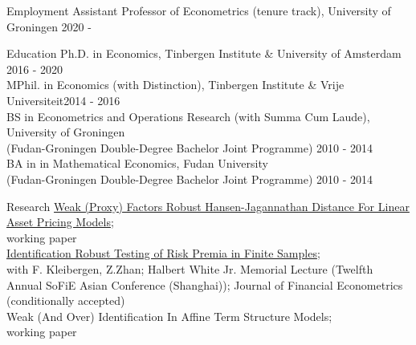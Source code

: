\documentclass{resume} %
\begin{document}
\begin{rSection}{Employment}
	Assistant Professor of Econometrics (tenure track), University of Groningen  \hfill 2020 - ~~~~~~~	
\end{rSection}
\begin{rSection}{Education} 
Ph.D. in Economics, Tinbergen Institute \& University of Amsterdam \hfill 2016 - 2020 \\
 MPhil. in Economics (with Distinction), Tinbergen Institute \& 
 Vrije Universiteit\hfill 2014 - 2016 \\ 
BS in Econometrics and Operations Research (with Summa Cum Laude), University of Groningen\\ (Fudan-Groningen Double-Degree Bachelor Joint Programme) \hfill 2010 - 2014\\
BA in in Mathematical Economics, Fudan University \\ (Fudan-Groningen Double-Degree Bachelor Joint Programme) \hfill 2010 - 2014
\end{rSection}
\begin{rSection}{Research}
	\href{https://lingwei-kong.github.io/files/temp1.pdf}{Weak (Proxy) Factors Robust Hansen-Jagannathan Distance For Linear Asset
	Pricing Models}; \\ working paper \\
	\href{https://lingwei-kong.github.io/files/JFEC_submission_2021}{Identiﬁcation Robust Testing of Risk Premia in Finite Samples}; \\
	with F. Kleibergen, Z.Zhan; Halbert White Jr. Memorial Lecture (Twelfth Annual SoFiE Asian Conference (Shanghai)); Journal of Financial Econometrics (conditionally accepted)\\ 
	Weak (And Over) Identiﬁcation In Aﬃne Term Structure Models; \\ working paper
\end{rSection}
\end{document}
